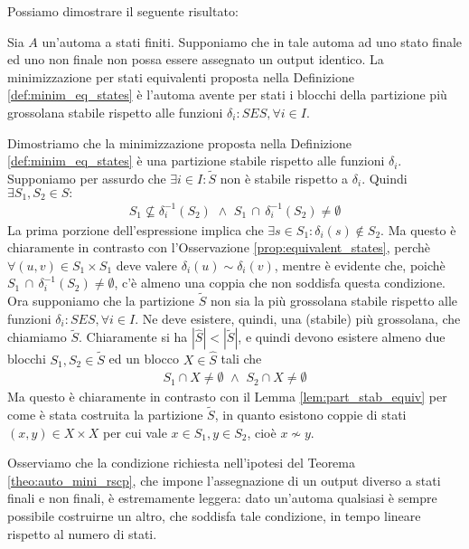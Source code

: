 Possiamo dimostrare il seguente risultato:
\begin{theorem}
    \label{theo:auto_mini_rscp}
    Sia $A$ un'automa a stati finiti. Supponiamo che in tale automa ad uno stato finale ed uno non finale non possa essere assegnato un output identico. La minimizzazione per stati equivalenti proposta nella Definizione \ref{def:minim_eq_states} è l'automa avente per stati i blocchi della partizione più grossolana stabile rispetto alle funzioni $\delta_i : S E S, \forall i \in I$.
\end{theorem}
\begin{proof2}
    Dimostriamo che la minimizzazione proposta nella Definizione \ref{def:minim_eq_states} è una partizione stabile rispetto alle funzioni $\delta_i$. Supponiamo per assurdo che $\exists i \in I : \widetilde{S}$ non è stabile rispetto a $\delta_i$. Quindi $\exists S_1, S_2 \in S :$
    \begin{gather*}
        S_1 \not\subseteq \delta_i^{-1}(S_2) \,\, \land \,\, S_1 \,\cap \,\delta_i^{-1}(S_2) \neq \emptyset
    \end{gather*}
    La prima porzione dell'espressione implica che $\exists s \in S_1 : \delta_i(s) \not\in S_2$. Ma questo è chiaramente in contrasto con l'Osservazione \ref{prop:equivalent_states}, perchè $\forall (u,v) \in S_1 \times S_1$ deve valere $\delta_i(u) \sim \delta_i(v)$, mentre è evidente che, poichè $S_1 \,\cap\, \delta_i^{-1}(S_2) \neq \emptyset$, c'è almeno una coppia che non soddisfa questa condizione.\\
    Ora supponiamo che la partizione $\widetilde{S}$ non sia la più grossolana stabile rispetto alle funzioni $\delta_i : S E S, \forall i \in I$. Ne deve esistere, quindi, una (stabile) più grossolana, che chiamiamo $\widetilde{S}$. Chiaramente si ha $|\widehat{S}| < |\widetilde{S}|$, e quindi devono esistere almeno due blocchi $S_1,S_2 \in \widetilde{S}$ ed un blocco $X \in \widehat{S}$ tali che
    \begin{gather*}
        S_1 \cap X \neq \emptyset \,\,\land\,\, S_2 \cap X \neq \emptyset
    \end{gather*}
    Ma questo è chiaramente in contrasto con il Lemma \ref{lem:part_stab_equiv} per come è stata costruita la partizione $\widetilde{S}$, in quanto esistono coppie di stati $(x,y) \in X \times X$ per cui vale $x \in S_1, y \in S_2$, cioè $x \not\sim y$.
\end{proof2}
Osserviamo che la condizione richiesta nell'ipotesi del Teorema \ref{theo:auto_mini_rscp}, che impone l'assegnazione di un output diverso a stati finali e non finali, è estremamente leggera: dato un'automa qualsiasi è sempre possibile costruirne un altro, che soddisfa tale condizione, in tempo lineare rispetto al numero di stati.

